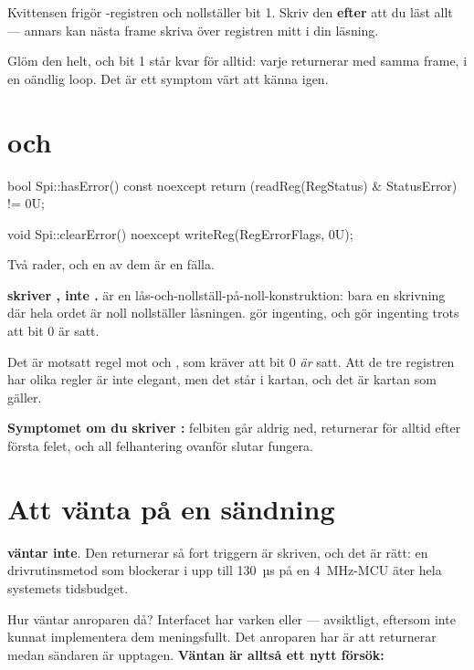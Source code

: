 Kvittensen frigör -registren och nollställer  bit 1. Skriv den
\textbf{efter} att du läst allt --- annars kan nästa frame skriva över registren mitt i din
läsning.

Glöm den helt, och bit 1 står kvar för alltid: varje  returnerar  med
samma frame, i en oändlig loop. Det är ett symptom värt att känna igen.

\section{\texorpdfstring{}{hasError()} och \texorpdfstring{}{clearError()}}
\label{sec:errors}

\begin{cppcode}
bool Spi::hasError() const noexcept
{
    return (readReg(RegStatus) & StatusError) != 0U;
}

void Spi::clearError() noexcept
{
    writeReg(RegErrorFlags, 0U);
}
\end{cppcode}

Två rader, och en av dem är en fälla.

\textbf{ skriver , inte .}  är en
lås-och-nollställ-på-noll-konstruktion: bara en skrivning där hela ordet är noll nollställer
låsningen.  gör ingenting, och  gör ingenting trots att bit 0 är satt.

Det är motsatt regel mot  och , som kräver att bit 0 \emph{är} satt.
Att de tre registren har olika regler är inte elegant, men det står i kartan, och det är kartan
som gäller.

\textbf{Symptomet om du skriver :} felbiten går aldrig ned,  returnerar
 för alltid efter första felet, och all felhantering ovanför slutar fungera.

\section{Att vänta på en sändning}
\label{sec:waiting}

 \textbf{väntar inte}. Den returnerar så fort triggern är skriven, och det är rätt: en
drivrutinsmetod som blockerar i upp till 130~µs på en 4~MHz-MCU äter hela systemets tidsbudget.

Hur väntar anroparen då? Interfacet har varken  eller  ---
avsiktligt, eftersom  inte kunnat implementera dem meningsfullt. Det anroparen har är
att  returnerar  medan sändaren är upptagen. \textbf{Väntan är alltså ett
nytt försök:}

